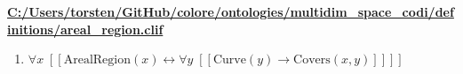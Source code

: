 \documentclass{article}
\begin{document}
\textbf{\url{C:/Users/torsten/GitHub/colore/ontologies/multidim\_space\_codi/definitions/areal\_region.clif}}

\begin{enumerate}
\item $\forall x\;  \left[ \left[ \textrm{ArealRegion}(x) \leftrightarrow \forall y\;  \left[ \left[ \textrm{Curve}(y) \rightarrow \textrm{Covers}(x,y) \right] \right] \right] \right]$
\end{enumerate}
\end{document}
